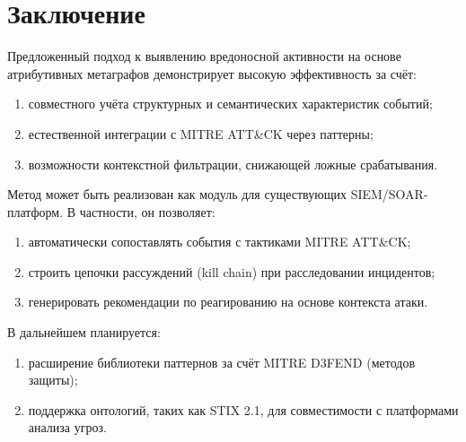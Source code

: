 \section*{Заключение}

Предложенный подход к выявлению вредоносной активности на основе атрибутивных метаграфов демонстрирует высокую эффективность за счёт:
\begin{enumerate}
    \item совместного учёта структурных и семантических характеристик событий;
    \item естественной интеграции с MITRE ATT\&CK через паттерны;
    \item возможности контекстной фильтрации, снижающей ложные срабатывания.
\end{enumerate}
Метод может быть реализован как модуль для существующих SIEM/SOAR-платформ. В частности, он позволяет:
\begin{enumerate}
    \item автоматически сопоставлять события с тактиками MITRE ATT\&CK;
    \item строить цепочки рассуждений (kill chain) при расследовании инцидентов;
    \item генерировать рекомендации по реагированию на основе контекста атаки.
\end{enumerate}
В дальнейшем планируется:
\begin{enumerate}
    \item расширение библиотеки паттернов за счёт MITRE D3FEND (методов защиты);
    \item поддержка онтологий, таких как STIX 2.1, для совместимости с платформами анализа угроз.
\end{enumerate}
